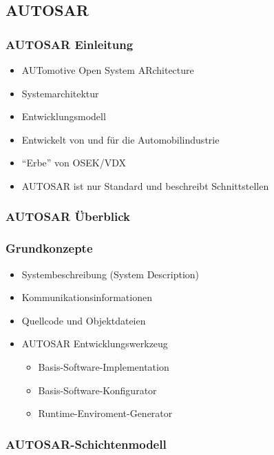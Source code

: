 \documentclass[]{beamer}
\newcommand{\inputImage}[1]{}
\begin{document}
\subsection{AUTOSAR}

\begin{frame}
\frametitle{AUTOSAR Einleitung}
    \begin{itemize}
        \item AUTomotive Open System ARchitecture
        \item Systemarchitektur
        \item Entwicklungsmodell
        \item Entwickelt von und für die Automobilindustrie
        \item "`Erbe"' von OSEK/VDX
        \item AUTOSAR ist nur Standard und beschreibt Schnittstellen
    \end{itemize}
\end{frame}

\begin{frame}[plain]
\frametitle{AUTOSAR Überblick}
    \begin{figure}[p]
        \centering
        \resizebox{0.64\linewidth}{!}{\inputImage{autosar_overview.dia}}
        \label{fig:autosar_overview}
    \end{figure}
\end{frame}

\begin{frame}
\frametitle{Grundkonzepte}
    \begin{itemize}
        \item Systembeschreibung (System Description)
        \item Kommunikationsinformationen
        \item Quellcode und Objektdateien
        \item AUTOSAR Entwicklungswerkzeug
        \begin{itemize}
            \item Basis-Software-Implementation
            \item Basis-Software-Konfigurator
            \item Runtime-Enviroment-Generator
        \end{itemize}
    \end{itemize}
\end{frame}


\begin{frame}
\frametitle{AUTOSAR-Schichtenmodell}
    \begin{figure}[ht]
        \centering
        \resizebox{0.98\linewidth}{!}{\inputImage{autosar_layer.dia}}
        \label{fig:autosar_layer}
    \end{figure}
\end{frame}
\end{document}
